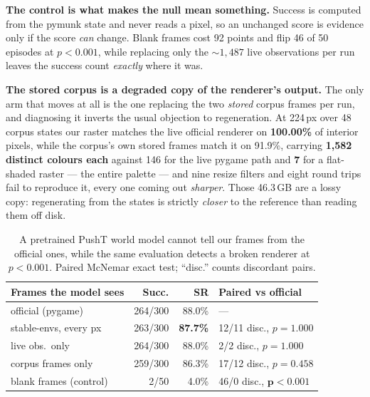 \documentclass{article}
\begin{document}
\textbf{The control is what makes the null mean something.} Success is computed
from the pymunk state and never reads a pixel, so an unchanged score is
evidence only if the score \emph{can} change. Blank frames cost 92 points and
flip 46 of 50 episodes at $p < 0.001$, while replacing only the ${\sim}1{,}487$
live observations per run leaves the success count \emph{exactly} where it was.

\textbf{The stored corpus is a degraded copy of the renderer's output.} The
only arm that moves at all is the one replacing the two \emph{stored} corpus
frames per run, and diagnosing it inverts the usual objection to regeneration.
At 224\,px over 48 corpus states our raster matches the live official
renderer on \textbf{100.00\%} of interior pixels, while the corpus's own stored
frames match it on 91.9\%, carrying \textbf{1,582 distinct colours each}
against 146 for the live pygame path and \textbf{7} for a flat-shaded raster
--- the entire palette --- and nine resize filters and eight round trips fail
to reproduce it, every one coming out \emph{sharper}. Those 46.3\,GB are a
lossy copy: regenerating from the states is strictly \emph{closer} to the
reference than reading them off disk.

\begin{table}[t]
\centering
\caption{A pretrained PushT world model cannot tell our frames from the
official ones, while the same evaluation detects a broken renderer at
$p < 0.001$. Paired McNemar exact test; ``disc.'' counts discordant pairs.}
\label{tab:lewm}
\vskip 0.06in
\footnotesize
\setlength{\tabcolsep}{3.5pt}
\begin{tabular}{lrrl}
\toprule
Frames the model sees & Succ. & SR & Paired vs official \\
\midrule
official (pygame)        & 264/300 & 88.0\% & --- \\
stable-envs, every px    & 263/300 & \textbf{87.7\%} & 12/11 disc., $p = 1.000$ \\
\quad live obs.\ only    & 264/300 & 88.0\% & \phantom{0}2/2 disc., $p = 1.000$ \\
\quad corpus frames only & 259/300 & 86.3\% & 17/12 disc., $p = 0.458$ \\
blank frames (control)   & \phantom{00}2/50 & 4.0\% & 46/0 disc., $\mathbf{p < 0.001}$ \\
\bottomrule
\end{tabular}
\end{table}
\end{document}
